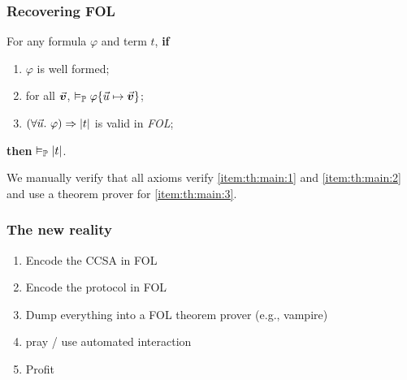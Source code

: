 \documentclass[aspectratio=169]{beamer}
\begin{document}
\begin{frame}
  \frametitle{Recovering FOL}

  \begin{theorem}
    For any formula $\varphi$ and term $t$, {\bfseries if}\pause
    \begin{enumerate}[<+->]
      \item\label{item:th:main:1} $\varphi$ is well formed;
      \item\label{item:th:main:2} for all $\vec{\bm{v}}$, $\validp \msubstit{\varphi}{\vecu}{\vecvb}$;
      \item\label{item:th:main:3} $\left( \forall\vecu.\ \varphi \right)\Rightarrow \meval{t}$ is valid in \emph{FOL};
    \end{enumerate}\pause
    {\bfseries then} $\validp \meval{t}$.
  \end{theorem}\pause

  We manually verify that all axioms verify \eqref{item:th:main:1} and \eqref{item:th:main:2} and use a theorem prover for \eqref{item:th:main:3}.

\end{frame}


  


\begin{frame}
  \frametitle{The new reality}\pause

  \begin{enumerate}
    \item Encode the CCSA in FOL 
    \item Encode the protocol in FOL\pause
    \item Dump everything into a FOL theorem prover {\RajdhaniRg (e.g., vampire)}\pause
    \item pray / use automated interaction\pause
    \item Profit
  \end{enumerate}

\end{frame}



\end{document}
